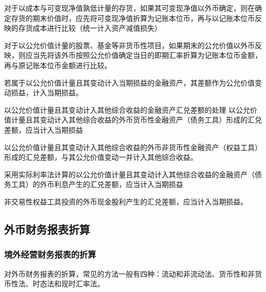 \documentclass[UTF8,12pt]{ctexart}
\numberwithin{equation}{section} %
\numberwithin{figure}{section}
\numberwithin{table}{section}
\begin{document}
\begin{enumerate}
		对于以成本与可变现净值孰低计量的存货，如果其可变现净值以外币确定，则在确定存货的期末价值时，应先将可变现净值折算为记账本位币，再与以记账本位币反映的存货成本进行比较（统一计入资产减值损失）
		
		对于以公允价值计量的股票、基金等非货币性项目，如果期末的公允价值以外币反映，则应当先将该外币按照公允价值确定当日的即期汇率折算为记账本位币金额，再与原记账本位币金额进行比较。
		
		若属于以公允价值计量且其变动计入当期损益的金融资产，其差额作为公允价值变动损益，计入当期损益。
		
		以公允价值计量且其变动计入其他综合收益的金融资产汇兑差额的处理
		以公允价值计量且其变动计入其他综合收益的外币货币性金融资产（债务工具）形成的汇兑差额，应当计入当期损益
		
		以公允价值计量且其变动计入其他综合收益的外币非货币性金融资产（权益工具）形成的汇兑差额，与其公允价值变动一并计入其他综合收益。
		
		采用实际利率法计算的以公允价值计量且其变动计入其他综合收益的金融资产（债务工具）的外币利息产生的汇兑差额，应当计入当期损益
		
		非交易性权益工具投资的外币现金股利产生的汇兑差额，应当计入当期损益。
	\end{enumerate}
	
	\subsection{外币财务报表折算}
	\subsubsection{境外经营财务报表的折算}
	对外币财务报表的折算，常见的方法一般有四种：流动和非流动法、货币性和非货币性法、时态法和现时汇率法。
	
\end{document}
